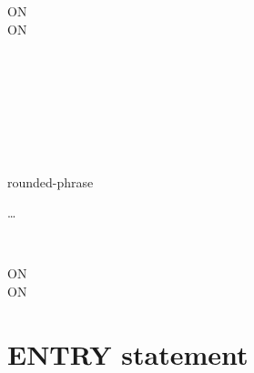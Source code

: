 \begin{0+}
  ON   \imperativestatement \\
   ON   \imperativestatement
\end{0+}

\begin{0-1}
\end{0-1}

\begin{1=}
  \identifier \\
  \literal
\end{1=}
\begin{1=}
   \\
\end{1=}
\begin{1=}
  \identifier \\
  \literal
\end{1=}

\begin{1=}
  \begin{1=}
    \identifier \\
    \literal
  \end{1=}
  \begin{0-1}
    rounded-phrase
  \end{0-1}
\end{1=}
\ldots

\begin{0-1}
  \begin{1=}
    \identifier \\
    \literal
  \end{1=}
\end{0-1}

\begin{0+}
  ON   \imperativestatement \\
   ON   \imperativestatement
\end{0+}

\begin{0-1}
\end{0-1}

\section{ENTRY statement}

